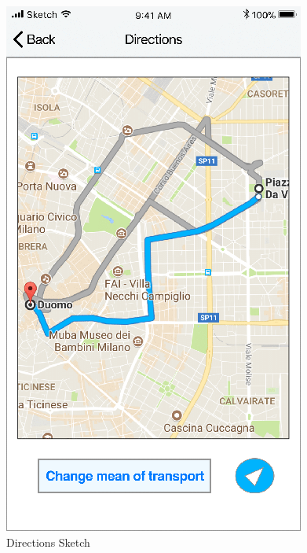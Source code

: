 \begin{figure}[H]
	\includegraphics[scale=0.23]{Images/Interface/Directions/3_directions}
	\caption{Directions Sketch}
\end{figure}

